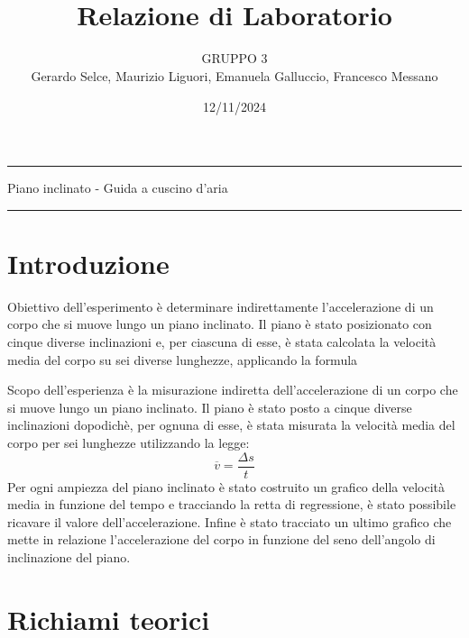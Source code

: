 \documentclass[11pt]{article}
\begin{document}
\setlength{\parindent}{0pt}
\title{\vspace{-4em}{\large Laboratorio di Meccanica e Termodinamica} \\
    Relazione di Laboratorio}
\author{GRUPPO 3 \\
    Gerardo Selce, Maurizio Liguori, Emanuela Galluccio, Francesco Messano}
\date{12/11/2024}
\maketitle

\vspace{-2em}\par\noindent\rule{\textwidth}{0.4pt}
\begin{center}
    {\Large\sc Piano inclinato - Guida a cuscino d'aria}  
\end{center}
\par\noindent\rule{\textwidth}{0.4pt}
\section{Introduzione}

Obiettivo dell’esperimento è determinare indirettamente l’accelerazione di un corpo che si muove lungo un piano inclinato. Il piano è stato posizionato con cinque diverse inclinazioni e, per ciascuna di esse, è stata calcolata la velocità media del corpo su sei diverse lunghezze, applicando la formula

Scopo dell'esperienza è la misurazione indiretta dell'accelerazione di un corpo che si muove lungo un piano inclinato. Il piano è stato posto a cinque diverse inclinazioni dopodichè, per ognuna di esse, è stata misurata la velocità media del corpo per sei lunghezze utilizzando la legge:
\begin{equation}
    \overline{v}=\frac{\Delta s}{t}
\end{equation}
Per ogni ampiezza del piano inclinato è stato costruito un grafico della velocità media in funzione del tempo e tracciando la retta di regressione, è stato possibile ricavare il valore dell'accelerazione. Infine è stato tracciato un ultimo grafico che mette in relazione l'accelerazione del corpo in funzione del seno dell'angolo di inclinazione del piano.

\section{Richiami teorici}
\end{document}

